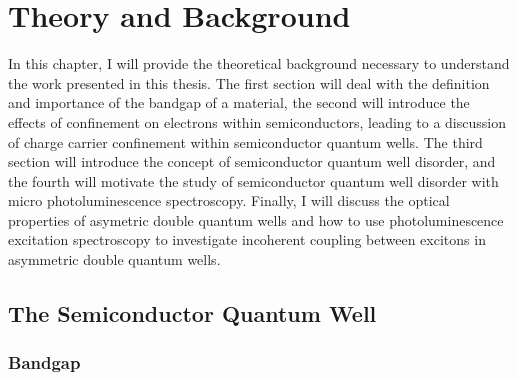 \chapter{Theory and Background}
In this chapter, I will provide the theoretical background necessary to understand the work presented in this thesis. The first section will deal with the definition and importance of the bandgap of a material, the second will introduce the effects of confinement on electrons within semiconductors, leading to a discussion of charge carrier confinement within semiconductor quantum wells. The third section will introduce the concept of semiconductor quantum well disorder, and the fourth will motivate the study of semiconductor quantum well disorder with micro photoluminescence spectroscopy. Finally, I will discuss the optical properties of asymetric double quantum wells and how to use photoluminescence excitation spectroscopy to investigate incoherent coupling between excitons in asymmetric double quantum wells.

\section{The Semiconductor Quantum Well}
\subsection{Bandgap}

